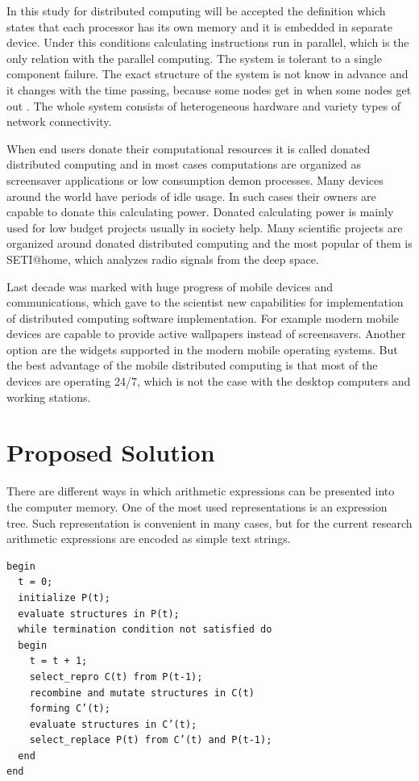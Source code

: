 \documentclass[graybox]{svmult}
\begin{document}
In this study for distributed computing will be accepted the definition which states that each processor has its own memory and it is embedded in separate device. Under this conditions calculating instructions run in parallel, which is the only relation with the parallel computing. The system is tolerant to a single component failure. The exact structure of the system is not know in advance and it changes with the time passing, because some nodes get in when some nodes get out \cite{balabanov02}. The whole system consists of heterogeneous hardware and variety types of network connectivity. 

When end users donate their computational resources it is called donated distributed computing and in most cases computations are organized as screensaver applications or low consumption demon processes. Many devices around the world have periods of idle usage. In such cases their owners are capable to donate this calculating power. Donated calculating power is mainly used for low budget projects usually in society help. Many scientific projects are organized around donated distributed computing and the most popular of them is SETI@home, which analyzes radio signals from the deep space. 

Last decade was marked with huge progress of mobile devices and communications, which gave to the scientist new capabilities for implementation of distributed computing software implementation. For example modern mobile devices are capable to provide active wallpapers instead of screensavers. Another option are the widgets supported in the modern mobile operating systems. But the best advantage of the mobile distributed computing is that most of the devices are operating 24/7, which is not the case with the desktop computers and working stations. 

\section{Proposed Solution} \label{Proposed Solution}

There are different ways in which arithmetic expressions can be presented into the computer memory. One of the most used representations is an expression tree. Such representation is convenient in many cases, but for the current research arithmetic expressions are encoded as simple text strings. 

\begin{lstlisting}[caption={Genetic algorithm pseudo-code.},label={lst01},backgroundcolor=\color{very-light-gray},frame={single}]
begin
  t = 0;
  initialize P(t);
  evaluate structures in P(t);
  while termination condition not satisfied do
  begin
    t = t + 1;
    select_repro C(t) from P(t-1);
    recombine and mutate structures in C(t)
    forming C’(t);
    evaluate structures in C’(t);
    select_replace P(t) from C’(t) and P(t-1);
  end
end
\end{lstlisting}
\end{document}
